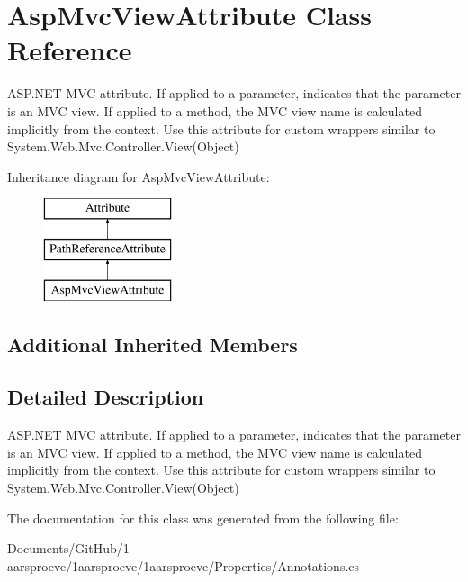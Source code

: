 \hypertarget{class_asp_mvc_view_attribute}{}\section{Asp\+Mvc\+View\+Attribute Class Reference}
\label{class_asp_mvc_view_attribute}


A\+S\+P.\+N\+E\+T M\+V\+C attribute. If applied to a parameter, indicates that the parameter is an M\+V\+C view. If applied to a method, the M\+V\+C view name is calculated implicitly from the context. Use this attribute for custom wrappers similar to {\ttfamily System.\+Web.\+Mvc.\+Controller.\+View(\+Object)}  


Inheritance diagram for Asp\+Mvc\+View\+Attribute\+:\begin{figure}[H]
\begin{center}
\leavevmode
\includegraphics[height=3.000000cm]{class_asp_mvc_view_attribute}
\end{center}
\end{figure}
\subsection*{Additional Inherited Members}


\subsection{Detailed Description}
A\+S\+P.\+N\+E\+T M\+V\+C attribute. If applied to a parameter, indicates that the parameter is an M\+V\+C view. If applied to a method, the M\+V\+C view name is calculated implicitly from the context. Use this attribute for custom wrappers similar to {\ttfamily System.\+Web.\+Mvc.\+Controller.\+View(\+Object)} 



The documentation for this class was generated from the following file\+:\begin{DoxyCompactItemize}
\item 
Documents/\+Git\+Hub/1-\/aarsproeve/1aarsproeve/1aarsproeve/\+Properties/Annotations.\+cs\end{DoxyCompactItemize}
